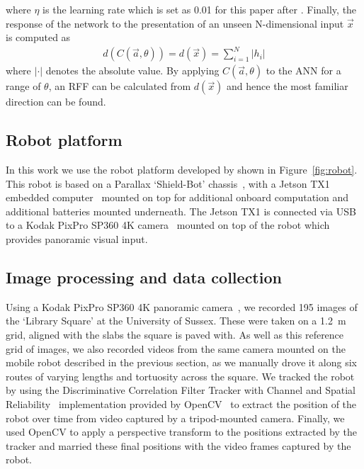\documentclass[letterpaper]{article}
\begin{document}
%
where $\eta$ is the learning rate which is set as \num{0.01} for this paper after \citet{Baddeley2012}. 
Finally, the response of the network to the presentation of an unseen N-dimensional input $\vec{x}$ is computed as
%
\begin{align}
    d(C(\vec{a}, \theta)) = d(\vec{x}) = \sum\limits_{i=1}^N |h_{i}|     \label{eqn:infomax_response}
\end{align}
%
where $|\cdot|$ denotes the absolute value.
By applying $C(\vec{a}, \theta)$ to the ANN for a range of $\theta$, an RFF can be calculated from $d(\vec{x})$ and hence the most familiar direction can be found.

\subsection{Robot platform}
\label{sec:robot_platform}
In this work we use the robot platform developed by \citet{Domcsek2018} shown in Figure~\ref{fig:robot}.
This robot is based on a Parallax `Shield-Bot' chassis~\citep{ParallaxInc}, with a Jetson TX1 embedded computer~\citep{NVIDIACorporation2016} mounted on top for additional onboard computation and additional batteries mounted underneath. 
The Jetson TX1 is connected via USB to a Kodak PixPro SP360 4K camera~\citep{JKImagingLtd} mounted on top of the robot which provides panoramic visual input.

\subsection{Image processing and data collection}
\label{sec:image_database}
Using a Kodak PixPro SP360 4K panoramic camera~\citep{JKImagingLtd}, we recorded \num{195} images of the ‘Library Square’ at the University of Sussex. 
These were taken on a \SI{1.2}{\metre} grid, aligned with the slabs the square is paved with.
As well as this reference grid of images, we also recorded videos from the same camera mounted on the mobile robot described in the previous section, as we manually drove it along six routes of varying lengths and tortuosity across the square. 
We tracked the robot by using the Discriminative Correlation Filter Tracker with Channel and Spatial Reliability~\citep{Lukezic2018} implementation provided by OpenCV~\citep{OpenCV} to extract the position of the robot over time from video captured by a tripod-mounted camera. 
Finally, we used OpenCV to apply a perspective transform to the positions extracted by the tracker and married these final positions with the video frames captured by the robot. 
\end{document}

